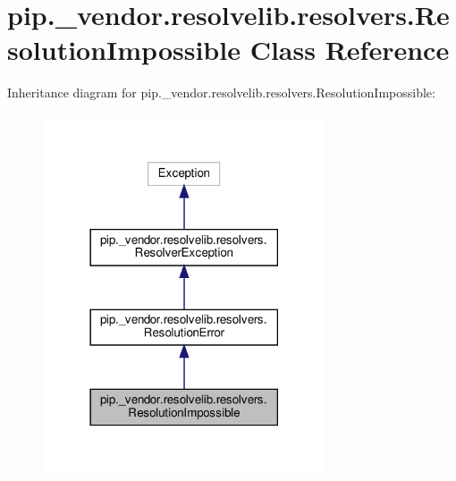 \hypertarget{classpip_1_1__vendor_1_1resolvelib_1_1resolvers_1_1ResolutionImpossible}{}\section{pip.\+\_\+vendor.\+resolvelib.\+resolvers.\+Resolution\+Impossible Class Reference}
\label{classpip_1_1__vendor_1_1resolvelib_1_1resolvers_1_1ResolutionImpossible}


Inheritance diagram for pip.\+\_\+vendor.\+resolvelib.\+resolvers.\+Resolution\+Impossible\+:
\nopagebreak
\begin{figure}[H]
\begin{center}
\leavevmode
\includegraphics[width=237pt]{classpip_1_1__vendor_1_1resolvelib_1_1resolvers_1_1ResolutionImpossible__inherit__graph}
\end{center}
\end{figure}


